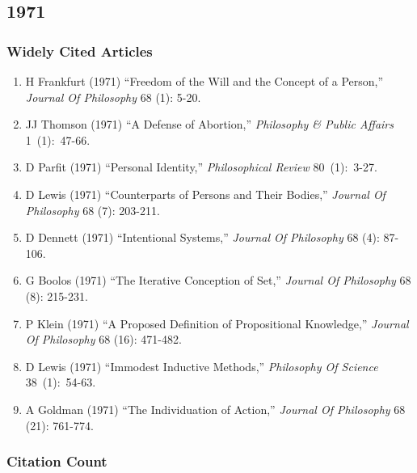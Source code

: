 \documentclass[
  10pt,
  letterpaper,
  DIV=11,
  numbers=noendperiod,
  twoside]{scrartcl}
\providecommand{\tightlist}{%
  \setlength{\itemsep}{0pt}\setlength{\parskip}{0pt}}\usepackage{longtable,booktabs,array}
\begin{document}
\newpage

\subsection{1971}\label{sec-s1971}

\subsubsection*{Widely Cited Articles}\label{widely-cited-articles-14}

\begin{enumerate}
\def\labelenumi{\arabic{enumi}.}
\tightlist
\item
  H Frankfurt (1971) ``Freedom of the Will and the Concept of a
  Person,'' \emph{Journal Of Philosophy} 68 (1): 5-20.
\item
  JJ Thomson (1971) ``A Defense of Abortion,'' \emph{Philosophy \&
  Public Affairs} 1~(1):~47-66.
\item
  D Parfit (1971) ``Personal Identity,'' \emph{Philosophical Review}
  80~(1):~3-27.
\item
  D Lewis (1971) ``Counterparts of Persons and Their Bodies,''
  \emph{Journal Of Philosophy} 68 (7): 203-211.
\item
  D Dennett (1971) ``Intentional Systems,'' \emph{Journal Of Philosophy}
  68 (4): 87-106.
\item
  G Boolos (1971) ``The Iterative Conception of Set,'' \emph{Journal Of
  Philosophy} 68 (8): 215-231.
\item
  P Klein (1971) ``A Proposed Definition of Propositional Knowledge,''
  \emph{Journal Of Philosophy} 68 (16): 471-482.
\item
  D Lewis (1971) ``Immodest Inductive Methods,'' \emph{Philosophy Of
  Science} 38~(1):~54-63.
\item
  A Goldman (1971) ``The Individuation of Action,'' \emph{Journal Of
  Philosophy} 68 (21): 761-774.
\end{enumerate}

\subsubsection*{Citation Count}\label{sec-count-1971}
\end{document}
